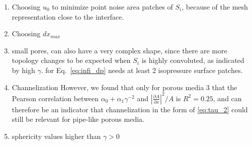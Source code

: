\documentclass[draft]{agujournal2019}
\begin{document}
\begin{enumerate}

	\item Choosing $u_0$ to minimize point noise area patches of $S_i$, because of the mesh representation close to the interface.
	\item Choosing $dx_{max}$
	\item small pores, can also have a very complex shape, since there are more topology changes to be expected when $S_i$ is highly convoluted, as indicated by high $\gamma$. for Eq.~\ref{eq:infi_dp} needs at least 2 isopressure surface patches. 

	\item Channelization However, we found that only for porous media 3 that the Pearson correlation between $\alpha_0 +\alpha_1\gamma^{-2}$ and $\left|\frac{\partial A}{\partial x }\right|^2/A$ is $R^2= 0.25$, and can therefore be an indicator that channelization in the form of \ref{eq:tau_2} could still be relevant for pipe-like porous media. 

	\item sphericity values higher than $\gamma >0$




\end{enumerate}
\end{document}
